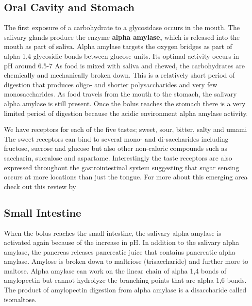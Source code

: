 \documentclass{tufte-handout}
\begin{document}
\subsection{Oral Cavity and Stomach}

The first exposure of a carbohydrate to a glycosidase occurs in the mouth. The salivary glands produce the enzyme \textbf{alpha amylase,} which is released into the mouth as part of saliva. Alpha amylase targets the oxygen bridges as part of alpha 1,4 glycosidic bonds between glucose units.  Its optimal activity occurs in pH around 6.5-7 As food is mixed with saliva and chewed, the carbohydrates are chemically and mechanically broken down. This is a relatively short period of digestion that produces oligo- and shorter polysaccharides and very few monosaccharides. As food travels from the mouth to the stomach, the salivary alpha amylase is still present. Once the bolus reaches the stomach there is a very limited period of digestion because the acidic environment alpha amylase activity.

  We have receptors for each of the five tastes; sweet, sour, bitter, salty and umami  The sweet receptors can bind to several mono- and di-saccharides including fructose, sucrose and glucose but also other non-caloric compounds such as saccharin, sucralose and aspartame.  Interestingly the taste receptors are also expressed throughout the gastrointestinal system suggesting that sugar sensing occurs at more locations than just the tongue.  For more about this emerging area check out this review by \citet{Janssen2013}

\subsection{Small Intestine}

When the bolus reaches the small intestine, the salivary alpha amylase is activated again because of the increase in pH. In addition to the salivary alpha amylase, the pancreas releases pancreatic juice that contains pancreatic alpha amylase. Amylose is broken down to maltriose (trisaccharide) and further more to maltose. Alpha amylase can work on the linear chain of alpha 1,4 bonds of amylopectin but cannot hydrolyze the branching points that are alpha 1,6 bonds. The product of amylopectin digestion from alpha amylase is a disaccharide called isomaltose.
\end{document}
